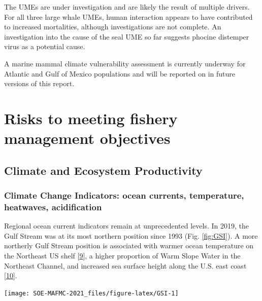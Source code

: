 \documentclass[
  10pt,
]{article}
\let\origfigure\figure
\let\endorigfigure\endfigure
\renewenvironment{figure}[1][2] {
    \expandafter\origfigure\expandafter[H]
} {
    \endorigfigure
}
\begin{document}
The UMEs are under investigation and are likely the result of multiple
drivers. For all three large whale UMEs, human interaction appears to
have contributed to increased mortalities, although investigations are
not complete. An investigation into the cause of the seal UME so far
suggests phocine distemper virus as a potential cause.

A marine mammal climate vulnerability assessment is currently underway
for Atlantic and Gulf of Mexico populations and will be reported on in
future versions of this report.

\hypertarget{risks-to-meeting-fishery-management-objectives}{%
\section{Risks to meeting fishery management
objectives}\label{risks-to-meeting-fishery-management-objectives}}

\hypertarget{climate-and-ecosystem-productivity}{%
\subsection{Climate and Ecosystem
Productivity}\label{climate-and-ecosystem-productivity}}

\hypertarget{climate-change-indicators-ocean-currents-temperature-heatwaves-acidification}{%
\subsubsection{Climate Change Indicators: ocean currents, temperature,
heatwaves,
acidification}\label{climate-change-indicators-ocean-currents-temperature-heatwaves-acidification}}

Regional ocean current indicators remain at unprecedented levels. In
2019, the Gulf Stream was at its most northern position since 1993 (Fig.
\ref{fig:GSI}). A more northerly Gulf Stream position is associated with
warmer ocean temperature on the Northeast US shelf
{[}\protect\hyperlink{ref-zhang_role_2007}{9}{]}, a higher proportion of
Warm Slope Water in the Northeast Channel, and increased sea surface
height along the U.S. east coast
{[}\protect\hyperlink{ref-goddard_extreme_2015}{10}{]}.

\begin{figure}

{\centering \texttt{[image: SOE-MAFMC-2021\_files/figure-latex/GSI-1]} 

}

\caption{Index representing changes in the location of the Gulf Stream north wall. Positive values represent a more northerly Gulf Stream position.}\label{fig:GSI}
\end{figure}
\end{document}
